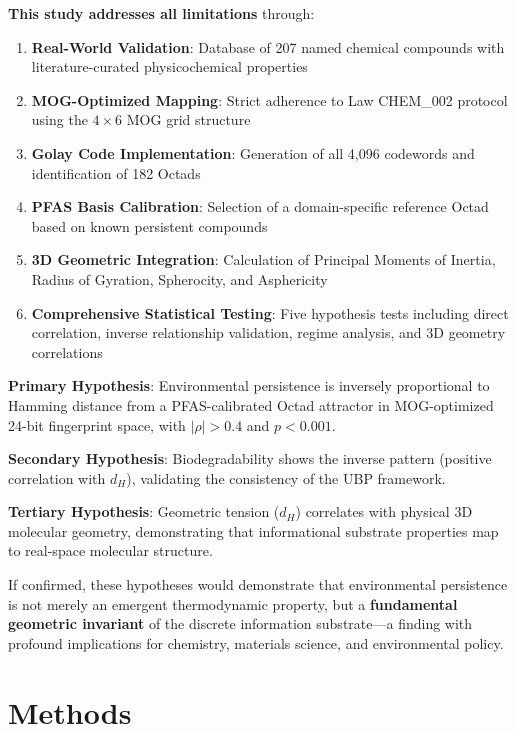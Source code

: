 \documentclass[11pt,letterpaper]{article}
\begin{document}
\textbf{This study addresses all limitations} through:

\begin{enumerate}
    \item \textbf{Real-World Validation}: Database of 207 named chemical compounds with literature-curated physicochemical properties
    \item \textbf{MOG-Optimized Mapping}: Strict adherence to Law CHEM\_002 protocol using the $4\times6$ MOG grid structure
    \item \textbf{Golay Code Implementation}: Generation of all 4,096 codewords and identification of 182 Octads
    \item \textbf{PFAS Basis Calibration}: Selection of a domain-specific reference Octad based on known persistent compounds
    \item \textbf{3D Geometric Integration}: Calculation of Principal Moments of Inertia, Radius of Gyration, Spherocity, and Asphericity
    \item \textbf{Comprehensive Statistical Testing}: Five hypothesis tests including direct correlation, inverse relationship validation, regime analysis, and 3D geometry correlations
\end{enumerate}

\textbf{Primary Hypothesis}: Environmental persistence is inversely proportional to Hamming distance from a PFAS-calibrated Octad attractor in MOG-optimized 24-bit fingerprint space, with $|\rho| > 0.4$ and $p < 0.001$.

\textbf{Secondary Hypothesis}: Biodegradability shows the inverse pattern (positive correlation with $d_H$), validating the consistency of the UBP framework.

\textbf{Tertiary Hypothesis}: Geometric tension ($d_H$) correlates with physical 3D molecular geometry, demonstrating that informational substrate properties map to real-space molecular structure.

If confirmed, these hypotheses would demonstrate that environmental persistence is not merely an emergent thermodynamic property, but a \textbf{fundamental geometric invariant} of the discrete information substrate—a finding with profound implications for chemistry, materials science, and environmental policy.

\section{Methods}
\end{document}
